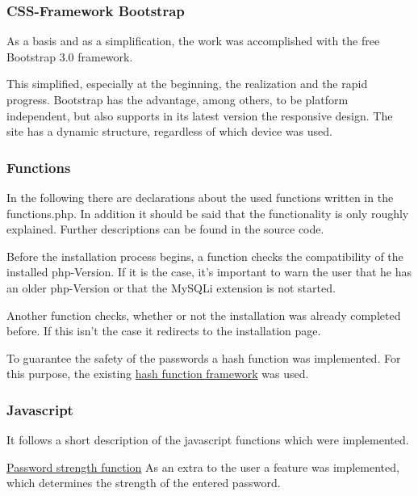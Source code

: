 \documentclass[a4paper,12pt,oneside]{article} %
\begin{document}
\subsubsection{CSS-Framework Bootstrap}

As a basis and as a simplification, the work was accomplished with the free Bootstrap 3.0 framework. 

This simplified, especially at the beginning, the realization and the rapid progress. 
Bootstrap has the advantage, among others, to be platform independent, but also supports in its 
latest version the \textquotedbl{}responsive design\textquotedbl{}. The site has a dynamic structure, 
regardless of which device was used.

\subsubsection{Functions}
In the following there are declarations about the used functions written in the functions.php.
In addition it should be said that the functionality is only roughly explained. Further descriptions can be found in the source code.

Before the installation process begins, a function checks the compatibility of the installed php-Version. If it is the case, it's important to warn the user that he has an older php-Version or that the MySQLi extension is not started. 

Another function checks, whether or not the installation was already completed before. If this isn't the case it redirects to the installation page. 

To guarantee the safety of the passwords a hash function was implemented. 
For this purpose, the existing \hyperlink{http://www.openwall.com/phpass/}{hash function framework}  was used. 

\subsubsection{Javascript}
It follows a short description of the javascript functions which were implemented. 

\hyperlink{https://github.com/ocean90/wpfmw-gallery/blob/master/assets/js/password-strength.js}{Password strength function}
As an extra to the user a feature was implemented, which determines the strength of the entered password.
\end{document}
